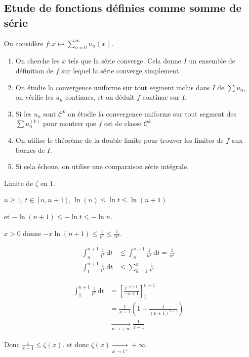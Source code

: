 \subsection{Etude de fonctions définies comme somme de série }


On considère $f : \displaystyle x \mapsto \sum_{n = 0}^{\infty} u_n(x)$. 

\begin{enumerate}
    \item On cherche les $x$ tels que la série converge. Cela donne $I$ un ensemble de définition 
    de $f$ sur lequel la série converge simplement.
    \item On étudie la convergence uniforme sur tout segment inclus dans $I$ de $\sum u_n$, on vérifie 
    les $u_n$ continues, et on déduit $f$ continue sur $I$.
    \item Si les $u_n$ sont $\mathscr C^k$ on étudie la convergence uniforme sur tout segment des 
    $\sum u_n^{(k)}$ pour montrer que $f$ est de classe $\mathscr{C}^k$ 
    \item On utilise le théorème de la double limite pour trouver les limites de $f$ aux bornes 
    de $I$. 
    \item Si cela échoue, on utilise une comparaison série intégrale. 
\end{enumerate}

\begin{exemple}
    Limite de $\zeta$ en $1$.

    $n \geqslant 1, \, t \in [n, n+ 1], \, \ln(n) \leqslant \ln t \leqslant \ln (n+ 1)$
    
    et $-\ln(n + 1) \leqslant - \ln t \leqslant - \ln n$.

    $x > 0$ donne $- x \ln(n + 1) \leqslant \frac 1 {t^x} \leqslant \frac 1 {n^x}$.

    \begin{align}
        \int_n^{n + 1} \frac 1 {t^x} \,\mathrm{d}t & \leqslant \int_n^{n + 1} \frac 1 {n^x} \,\mathrm{d}t = \frac 1 {n^x} \\
        \int_1^{n + 1} \frac 1 {t^x} \, \mathrm{d}t & \leqslant \sum_{k = 1 }^{n } \frac 1 {k^x} 
    \end{align}

    \begin{align}
        \int_{1 }^{n + 1 } \frac 1 {t^x} \, \mathrm{d}t &  = \left[ \frac{t^{- x + 1}}{- x + 1} \right]_{1}^{n + 1} \\
        & = \frac{1 }{x - 1} \left( 1 - \frac 1 {(n + 1)^{x - 1}} \right)\\
        & \xrightarrow[n \to + \infty]{} \frac 1 {x - 1}
    \end{align} 

    Donc $\frac 1 {x - 1} \leqslant \zeta(x)$. et donc $\zeta(x) \xrightarrow[x \to 1^+]{} + \infty$.
\end{exemple}

